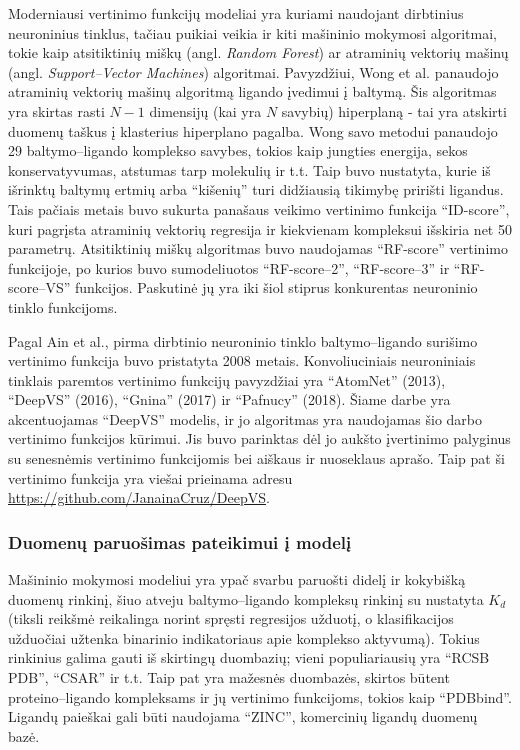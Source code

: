 Moderniausi vertinimo funkcijų modeliai yra kuriami naudojant dirbtinius neuroninius tinklus, tačiau puikiai veikia ir kiti mašininio mokymosi algoritmai, tokie kaip atsitiktinių miškų (angl. \textit{Random Forest}) ar atraminių vektorių mašinų (angl. \textit{Support--Vector Machines}) algoritmai. Pavyzdžiui, Wong et al. \cite{wong_predicting_2013} panaudojo atraminių vektorių mašinų algoritmą ligando įvedimui į baltymą. Šis algoritmas yra skirtas rasti $N-1$ dimensijų (kai yra $N$ savybių) hiperplaną - tai yra atskirti duomenų taškus į klasterius hiperplano pagalba. Wong savo metodui panaudojo 29 baltymo--ligando komplekso savybes, tokios kaip jungties energija, sekos konservatyvumas, atstumas tarp molekulių ir t.t. Taip buvo nustatyta, kurie iš išrinktų baltymų ertmių arba \enquote{kišenių} turi didžiausią tikimybę pririšti ligandus. Tais pačiais metais buvo sukurta panašaus veikimo vertinimo funkcija \enquote{ID-score}, kuri pagrįsta atraminių vektorių regresija ir kiekvienam kompleksui išskiria net 50 parametrų.\cite{li_id-score_2013} Atsitiktinių miškų algoritmas buvo naudojamas \enquote{RF-score} vertinimo funkcijoje, po kurios buvo sumodeliuotos \enquote{RF-score--2}, \enquote{RF-score--3} ir \enquote{RF-score--VS} funkcijos. Paskutinė jų yra iki šiol stiprus konkurentas neuroninio tinklo funkcijoms.\cite{wojcikowski_performance_2017}

Pagal Ain et al.,\cite{ain_machine-learning_2015} pirma dirbtinio neuroninio tinklo baltymo--ligando surišimo vertinimo funkcija buvo pristatyta 2008 metais. Konvoliuciniais neuroniniais tinklais paremtos vertinimo funkcijų pavyzdžiai yra \enquote{AtomNet} (2013)\cite{wallach_atomnet_2015}, \enquote{DeepVS} (2016)\cite{pereira_boosting_2016}, \enquote{Gnina} (2017)\cite{ragoza_proteinligand_2017} ir \enquote{Pafnucy} (2018)\cite{stepniewska-dziubinska_development_2018}. Šiame darbe yra akcentuojamas \enquote{DeepVS} modelis, ir jo algoritmas yra naudojamas šio darbo vertinimo funkcijos kūrimui. Jis buvo parinktas dėl jo aukšto įvertinimo palyginus su senesnėmis vertinimo funkcijomis bei aiškaus ir nuoseklaus aprašo. Taip pat ši vertinimo funkcija yra viešai prieinama adresu \url{https://github.com/JanainaCruz/DeepVS}. 

\subsubsection{Duomenų paruošimas pateikimui į modelį}

Mašininio mokymosi modeliui yra ypač svarbu paruošti didelį ir kokybišką duomenų rinkinį, šiuo atveju baltymo--ligando kompleksų rinkinį su nustatyta $K_{d}$ (tiksli reikšmė reikalinga norint spręsti regresijos užduotį, o klasifikacijos užduočiai užtenka binarinio indikatoriaus apie komplekso aktyvumą). Tokius rinkinius galima gauti iš skirtingų duombazių; vieni populiariausių yra \enquote{RCSB PDB}, \enquote{CSAR} ir t.t.\cite{ragoza_proteinligand_2017} Taip pat yra mažesnės duombazės, skirtos būtent proteino--ligando kompleksams ir jų vertinimo funkcijoms, tokios kaip \enquote{PDBbind}. Ligandų paieškai gali būti naudojama \enquote{ZINC}, komercinių ligandų duomenų bazė. 

